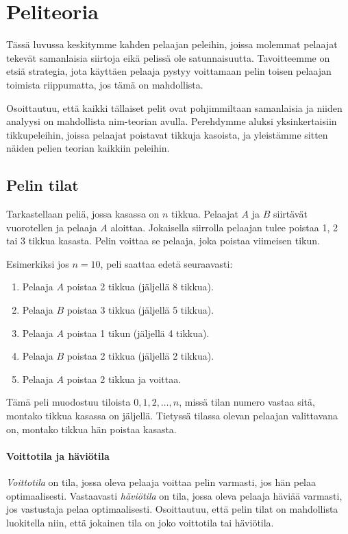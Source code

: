 \chapter{Peliteoria}

Tässä luvussa keskitymme kahden pelaajan peleihin,
joissa molemmat pelaajat tekevät
samanlaisia siirtoja eikä pelissä ole satunnaisuutta.
Tavoitteemme on etsiä strategia, jota käyttäen
pelaaja pystyy voittamaan pelin toisen pelaajan
toimista riippumatta, jos tämä on mahdollista.

Osoittautuu, että kaikki tällaiset pelit ovat
pohjimmiltaan samanlaisia ja niiden analyysi on
mahdollista nim-teorian avulla.
Perehdymme aluksi yksinkertaisiin tikkupeleihin,
joissa pelaajat poistavat tikkuja kasoista,
ja yleistämme sitten näiden pelien teorian kaikkiin peleihin.

\section{Pelin tilat}

Tarkastellaan peliä, jossa kasassa on $n$ tikkua.
Pelaajat $A$ ja $B$ siirtävät vuorotellen ja
pelaaja $A$ aloittaa.
Jokaisella siirrolla pelaajan tulee poistaa
1, 2 tai 3 tikkua kasasta.
Pelin voittaa se pelaaja, joka poistaa viimeisen tikun.

Esimerkiksi jos $n=10$, peli saattaa edetä seuraavasti:
\begin{enumerate}[noitemsep]
\item Pelaaja $A$ poistaa 2 tikkua (jäljellä 8 tikkua).
\item Pelaaja $B$ poistaa 3 tikkua (jäljellä 5 tikkua).
\item Pelaaja $A$ poistaa 1 tikun (jäljellä 4 tikkua).
\item Pelaaja $B$ poistaa 2 tikkua (jäljellä 2 tikkua).
\item Pelaaja $A$ poistaa 2 tikkua ja voittaa.
\end{enumerate}
Tämä peli muodostuu tiloista $0,1,2,\ldots,n$,
missä tilan numero vastaa sitä, montako tikkua
kasassa on jäljellä.
Tietyssä tilassa olevan pelaajan valittavana on,
montako tikkua hän poistaa kasasta.

\subsubsection{Voittotila ja häviötila}


\textit{Voittotila} on tila, jossa oleva pelaaja voittaa
pelin varmasti, jos hän pelaa optimaalisesti.
Vastaavasti \textit{häviötila} on tila,
jossa oleva pelaaja häviää varmasti, jos vastustaja
pelaa optimaalisesti.
Osoittautuu, että pelin tilat on mahdollista luokitella
niin, että jokainen tila on joko voittotila tai häviötila.

